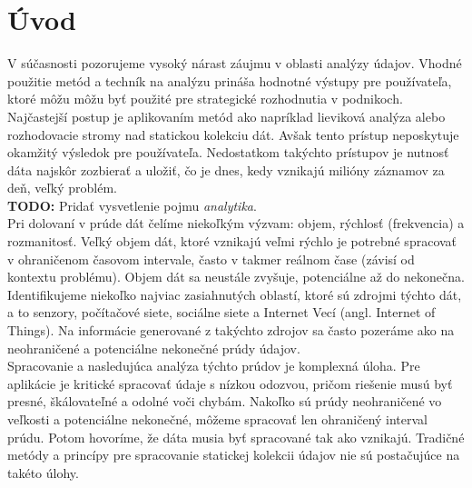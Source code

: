%

\chapter{Úvod}
V súčasnosti pozorujeme vysoký nárast záujmu v oblasti analýzy údajov. Vhodné použitie metód a techník na analýzu prináša hodnotné výstupy pre používateľa, ktoré môžu môžu byť použité pre strategické rozhodnutia v podnikoch. Najčastejší postup je aplikovaním metód ako napríklad lieviková analýza alebo rozhodovacie stromy nad statickou kolekciu dát. Avšak tento prístup neposkytuje okamžitý výsledok pre používateľa. Nedostatkom takýchto prístupov je nutnosť dáta najskôr zozbierať a uložiť, čo je dnes, kedy vznikajú milióny záznamov za deň, veľký problém.\\
\textbf{TODO: }Pridať vysvetlenie pojmu \textit{analytika}. \\
Pri dolovaní v prúde dát čelíme niekoľkým výzvam: objem,  rýchlosť (frekvencia) a rozmanitosť. Veľký objem dát, ktoré vznikajú veľmi rýchlo je potrebné spracovať v ohraničenom časovom intervale, často v takmer reálnom čase (závisí od kontextu problému). Objem dát sa neustále zvyšuje, potenciálne až do nekonečna. Identifikujeme niekoľko najviac zasiahnutých oblastí, ktoré sú zdrojmi týchto dát, a to senzory, počítačové siete, sociálne siete a Internet Vecí (angl. Internet of Things). Na informácie generované z takýchto zdrojov sa často pozeráme ako na neohraničené a potenciálne nekonečné prúdy údajov. \\
Spracovanie a nasledujúca analýza týchto prúdov je komplexná úloha. Pre aplikácie je kritické spracovať údaje s nízkou odozvou, pričom riešenie musú byť presné, škálovateľné a odolné voči chybám. Nakoľko sú prúdy neohraničené vo veľkosti a potenciálne nekonečné, môžeme spracovať len ohraničený interval prúdu. Potom hovoríme, že dáta musia byť spracované tak ako vznikajú. Tradičné metódy a princípy pre spracovanie statickej kolekcii údajov nie sú postačujúce na takéto úlohy. 
